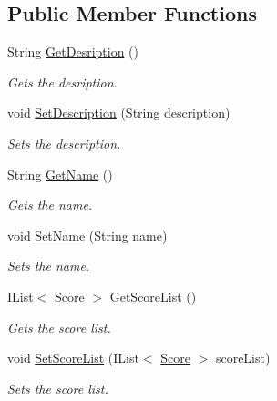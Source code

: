 \subsection*{Public Member Functions}
\begin{DoxyCompactItemize}
\item 
String \hyperlink{classcom_1_1shephertz_1_1app42_1_1paas_1_1sdk_1_1csharp_1_1game_1_1_game_aa479abcc3d2895f1b80ddde78b82ccf1}{Get\+Desription} ()
\begin{DoxyCompactList}\small\item\em Gets the desription. \end{DoxyCompactList}\item 
void \hyperlink{classcom_1_1shephertz_1_1app42_1_1paas_1_1sdk_1_1csharp_1_1game_1_1_game_aa4edfacf9ace090433d701daaf66e935}{Set\+Description} (String description)
\begin{DoxyCompactList}\small\item\em Sets the description. \end{DoxyCompactList}\item 
String \hyperlink{classcom_1_1shephertz_1_1app42_1_1paas_1_1sdk_1_1csharp_1_1game_1_1_game_ad765781cfec536167213c22127481753}{Get\+Name} ()
\begin{DoxyCompactList}\small\item\em Gets the name. \end{DoxyCompactList}\item 
void \hyperlink{classcom_1_1shephertz_1_1app42_1_1paas_1_1sdk_1_1csharp_1_1game_1_1_game_af004e0a4b7e665b02a59d64ffb9f71a7}{Set\+Name} (String name)
\begin{DoxyCompactList}\small\item\em Sets the name. \end{DoxyCompactList}\item 
I\+List$<$ \hyperlink{classcom_1_1shephertz_1_1app42_1_1paas_1_1sdk_1_1csharp_1_1game_1_1_game_1_1_score}{Score} $>$ \hyperlink{classcom_1_1shephertz_1_1app42_1_1paas_1_1sdk_1_1csharp_1_1game_1_1_game_a29a3573cb7d3a9e98ae25c1f66b96c98}{Get\+Score\+List} ()
\begin{DoxyCompactList}\small\item\em Gets the score list. \end{DoxyCompactList}\item 
void \hyperlink{classcom_1_1shephertz_1_1app42_1_1paas_1_1sdk_1_1csharp_1_1game_1_1_game_a71bf06d57d28a5050314271bc5bc18b8}{Set\+Score\+List} (I\+List$<$ \hyperlink{classcom_1_1shephertz_1_1app42_1_1paas_1_1sdk_1_1csharp_1_1game_1_1_game_1_1_score}{Score} $>$ score\+List)
\begin{DoxyCompactList}\small\item\em Sets the score list. \end{DoxyCompactList}\end{DoxyCompactItemize}
